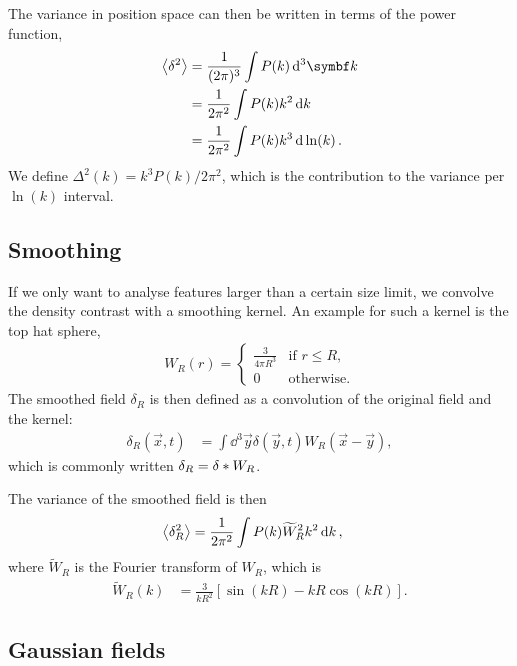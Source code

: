 The variance in position space can then be written in terms of the power function,
\begin{align*}
	\moment{\delta^2}
	&= \frac{1}{(2\pi)^3} \int P(k) \dd{^3\vec{k}}\\
	&= \frac{1}{2\pi^2} \int P(k) k^2 \dd{k}\\
	&= \frac{1}{2\pi^2} \int P(k) k^3 \dd{\ln(k)}.
\end{align*}
We define $\Delta^2(k) = k^3 P(k)/2\pi^2$, which is the contribution to the variance per $\ln(k)$ interval.

\subsection{Smoothing}
If we only want to analyse features larger than a certain size limit, we convolve the density contrast with a smoothing kernel. An example for such a kernel is the top hat sphere,
\begin{align*}
	W_R(r) = 
	\begin{cases}
	\frac{3}{4\pi R^3} & \text{if } r \leq R,\\
	0 & \text{otherwise}.
	\end{cases}
\end{align*}
The smoothed field $\delta_R$ is then defined as a convolution of the original field and the kernel:
\begin{align*}
	\delta_R(\vec{x},t)
	&= \int \dd{^3 \vec{y}} \delta(\vec{y},t) W_R(\vec{x}-\vec{y}),
\end{align*}
which is commonly written $\delta_R = \delta * W_R$.

The variance of the smoothed field is then
\begin{align*}
	\left\langle \delta_R^2 \right\rangle
	&= \frac{1}{2 \pi^2} \int P(k) \widetilde{W}_R^2 k^2 \dd{k},
\end{align*}
where $\widetilde{W}_R$ is the Fourier transform of $W_R$, which is
\begin{align*}
	\widetilde{W}_R(k)
	&= \frac{3}{k R^2} [\sin(kR) - kR \cos(kR)].
\end{align*}

\subsection{Gaussian fields}

